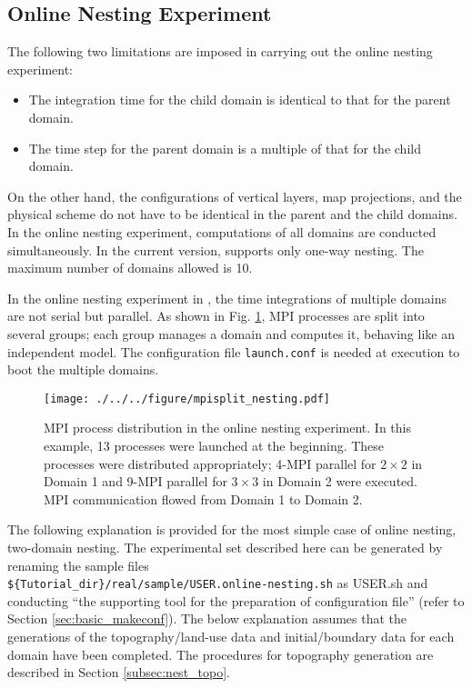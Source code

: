\subsection{Online Nesting Experiment} \label{subsec:nest_online}

The following two limitations are imposed in carrying out the online nesting experiment:
\begin{itemize}
\item The integration time for the child domain is identical to that for the parent domain.
\item The time step for the parent domain is a multiple of that for the child domain.
\end{itemize}
On the other hand, the configurations of vertical layers, map projections, and the physical scheme do not have to be identical in the parent and the child domains. In the online nesting experiment, computations of all domains are conducted simultaneously. In the current version, \scalerm supports only one-way nesting. The maximum number of domains allowed is 10.

In the online nesting experiment in \scalerm, the time integrations of multiple domains are not serial but parallel. As shown in Fig. \ref{fig_mpisplit}, MPI processes are split into several groups; each group manages a domain and computes it, behaving like an independent model. The configuration file \verb|launch.conf| is needed at execution to boot the multiple domains.

\begin{figure}[tbh]
\begin{center}
  \texttt{[image: ./../../figure/mpisplit\_nesting.pdf]}\\
  \caption{ MPI process distribution in the online nesting experiment. In this example, 13 processes were launched at the beginning. These processes were distributed appropriately; 4-MPI parallel for $2 \times 2$ in Domain 1 and 9-MPI parallel for $3 \times 3$ in Domain 2 were executed. MPI communication flowed from Domain 1 to Domain 2.
  }
  \label{fig_mpisplit}
\end{center}
\end{figure}

The following explanation is provided for the most simple case of online nesting, two-domain nesting.
The experimental set described here can be generated by renaming the sample files \\
\verb|${Tutorial_dir}/real/sample/USER.online-nesting.sh|
as USER.sh and conducting ``the supporting tool for the preparation of configuration file'' (refer to Section \ref{sec:basic_makeconf}).
The below explanation assumes that the generations of the topography/land-use data and initial/boundary data for each domain have been completed. The procedures for topography generation are described in Section \ref{subsec:nest_topo}.


